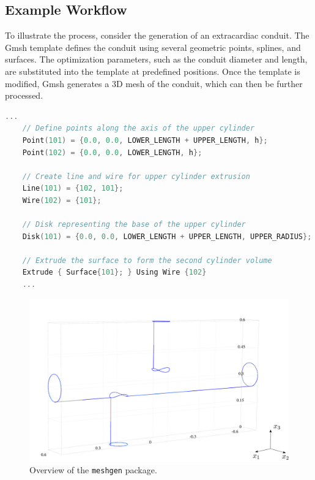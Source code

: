 \subsection{Example Workflow}

To illustrate the process, consider the generation of an extracardiac conduit. The Gmsh template defines the conduit using several geometric points, splines, and surfaces. The optimization parameters, such as the conduit diameter and length, are substituted into the template at predefined positions. Once the template is modified, Gmsh generates a 3D mesh of the conduit, which can then be further processed.

\begin{lstlisting}[language=C++]
	...
	// Define points along the axis of the upper cylinder
	Point(101) = {0.0, 0.0, LOWER_LENGTH + UPPER_LENGTH, h};
	Point(102) = {0.0, 0.0, LOWER_LENGTH, h};
	
	// Create line and wire for upper cylinder extrusion
	Line(101) = {102, 101};
	Wire(102) = {101};
	
	// Disk representing the base of the upper cylinder
	Disk(101) = {0.0, 0.0, LOWER_LENGTH + UPPER_LENGTH, UPPER_RADIUS};
	
	// Extrude the surface to form the second cylinder volume
	Extrude { Surface{101}; } Using Wire {102}
	...
\end{lstlisting}


\begin{figure}[H]
	\centering
	\vspace{6mm}
	\includegraphics[width=.99\textwidth]{figures/gmsh.pdf}
	\vspace{4mm}
	\caption{Overview of the \texttt{meshgen} package.}
	\label{fig:gmsh}
\end{figure}



